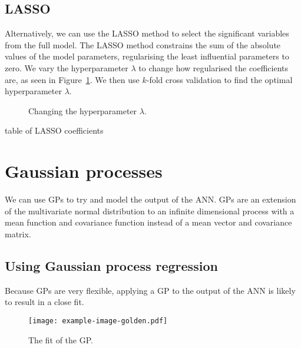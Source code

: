 \subsection{LASSO}

Alternatively, we can use the \ac{LASSO} method to select the significant variables from the full model.
The \ac{LASSO} method constrains the sum of the absolute values of the model parameters, regularising the least influential parameters to zero.
We vary the hyperparameter \(\lambda\) to change how regularised the coefficients are, as seen in Figure~\ref{fig:lasso-lambda}.
We then use \(k\)-fold cross validation to find the optimal hyperparameter \(\lambda\).

\begin{figure}[htbp]
	\centering
	
	\caption{Changing the hyperparameter \(\lambda\).}
	\label{fig:lasso-lambda}
\end{figure}

\begin{todo}
	table of LASSO coefficients
\end{todo}

\section{Gaussian processes}

We can use \acp{GP} to try and model the output of the \ac{ANN}.
\acp{GP} are an extension of the multivariate normal distribution to an infinite dimensional process with a mean function and covariance function instead of a mean vector and covariance matrix.

\subsection{Using Gaussian process regression}

Because \acp{GP} are very flexible, applying a GP to the output of the ANN is likely to result in a close fit.

\begin{figure}[htbp]
	\centering
	\texttt{[image: example-image-golden.pdf]}
	\caption{The fit of the \ac{GP}.}
	\label{fig:gp-fit}
\end{figure}
